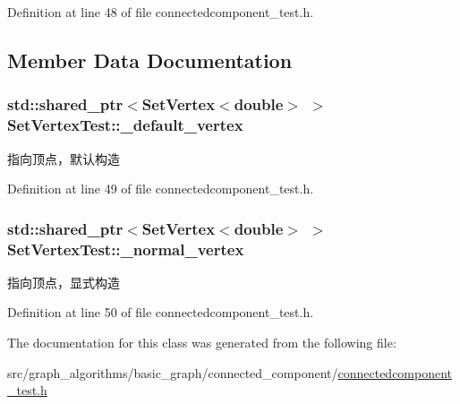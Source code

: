 Definition at line 48 of file connectedcomponent\+\_\+test.\+h.



\subsection{Member Data Documentation}
\hypertarget{class_set_vertex_test_a886fbbe6fd5a4e4c954f2ff38951f90b}{}
\subsubsection[{\+\_\+default\+\_\+vertex}]{\setlength{\rightskip}{0pt plus 5cm}std\+::shared\+\_\+ptr$<${\bf Set\+Vertex}$<$double$>$ $>$ Set\+Vertex\+Test\+::\+\_\+default\+\_\+vertex\hspace{0.3cm}{\ttfamily [protected]}}\label{class_set_vertex_test_a886fbbe6fd5a4e4c954f2ff38951f90b}
指向顶点，默认构造 

Definition at line 49 of file connectedcomponent\+\_\+test.\+h.

\hypertarget{class_set_vertex_test_af78af1aa633b65214ed39e8956beee39}{}
\subsubsection[{\+\_\+normal\+\_\+vertex}]{\setlength{\rightskip}{0pt plus 5cm}std\+::shared\+\_\+ptr$<${\bf Set\+Vertex}$<$double$>$ $>$ Set\+Vertex\+Test\+::\+\_\+normal\+\_\+vertex\hspace{0.3cm}{\ttfamily [protected]}}\label{class_set_vertex_test_af78af1aa633b65214ed39e8956beee39}
指向顶点，显式构造 

Definition at line 50 of file connectedcomponent\+\_\+test.\+h.



The documentation for this class was generated from the following file\+:\begin{DoxyCompactItemize}
\item 
src/graph\+\_\+algorithms/basic\+\_\+graph/connected\+\_\+component/\hyperlink{connectedcomponent__test_8h}{connectedcomponent\+\_\+test.\+h}\end{DoxyCompactItemize}
